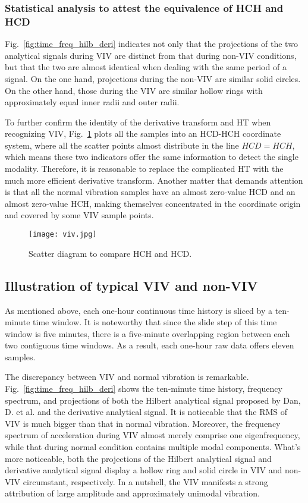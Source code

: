 \documentclass[preprint, 3p, times, compress, 11pt]{elsarticle}
\begin{document}
\subsubsection{Statistical analysis to attest the equivalence of HCH and HCD}

Fig.~\ref{fig:time_freq_hilb_deri} indicates not only that the 
projections of the two analytical signals during VIV are distinct from 
that during non-VIV conditions, but that the two are almost identical 
when dealing with the same period of a signal. On the one hand, 
projections during the non-VIV are similar solid circles. On the other 
hand, those during the VIV are similar hollow rings with approximately 
equal inner radii and outer radii.

To further confirm the identity of the derivative transform and HT when 
recognizing VIV, Fig.~\ref{fig:HCH_HCD} plots all the samples into an 
HCD-HCH coordinate system, where all the scatter points almost distribute 
in the line $HCD = HCH$, which means these two indicators offer 
the same information to detect the single modality. 
Therefore, it is reasonable to replace 
the complicated HT with the much more efficient derivative transform. 
Another matter that demands attention is that all the normal vibration 
samples have an almost zero-value HCD and an almost zero-value HCH, 
making themselves concentrated in the coordinate origin and covered by 
some VIV sample points.

\begin{figure}[ht]
    \centering
    \texttt{[image: viv.jpg]}
    \caption{Scatter diagram to compare HCH and HCD.}
    \label{fig:HCH_HCD}
\end{figure}

\subsection{Illustration of typical VIV and non-VIV} 

As mentioned above, each one-hour continuous time history is sliced by 
a ten-minute time window. It is noteworthy that since the slide step of 
this time window is five minutes, there is a five-minute overlapping 
region between each two contiguous time windows. As a result, each 
one-hour raw data offers eleven samples.

The discrepancy between VIV and normal vibration is remarkable. 
Fig.~\ref{fig:time_freq_hilb_deri} shows the ten-minute time history, 
frequency spectrum, and projections of both the Hilbert analytical signal 
proposed by Dan, D. et al. \cite{dan2022monitoring} and the 
derivative analytical signal. It is noticeable that the RMS of VIV is 
much bigger than that in normal vibration. Moreover, the frequency 
spectrum of acceleration during VIV almost merely comprise one 
eigenfrequency, while that during normal condition contains multiple 
modal components. What's more noticeable, both the projections of the 
Hilbert analytical signal and derivative analytical signal display a 
hollow ring and solid circle in VIV and non-VIV circumstant, 
respectively. In a nutshell, the VIV manifests a strong attribution 
of large amplitude and approximately unimodal vibration.
\end{document}
